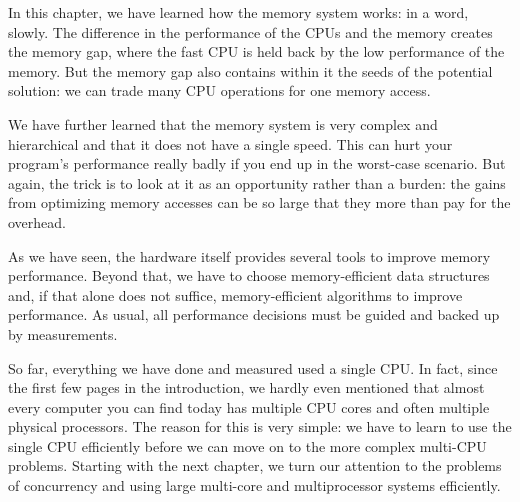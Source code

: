 In this chapter, we have learned how the memory system works: in a word, slowly. The difference in the performance of the CPUs and the memory creates the memory gap, where the fast CPU is held back by the low performance of the memory. But the memory gap also contains within it the seeds of the potential solution: we can trade many CPU operations for one memory access.

We have further learned that the memory system is very complex and hierarchical and that it does not have a single speed. This can hurt your program's performance really badly if you end up in the worst-case scenario. But again, the trick is to look at it as an opportunity rather than a burden: the gains from optimizing memory accesses can be so large that they more than pay for the overhead. 

As we have seen, the hardware itself provides several tools to improve memory performance. Beyond that, we have to choose memory-efficient data structures and, if that alone does not suffice, memory-efficient algorithms to improve performance. As usual, all performance decisions must be guided and backed up by measurements.

So far, everything we have done and measured used a single CPU. In fact, since the first few pages in the introduction, we hardly even mentioned that almost every computer you can find today has multiple CPU cores and often multiple physical processors. The reason for this is very simple: we have to learn to use the single CPU efficiently before we can move on to the more complex multi-CPU problems. Starting with the next chapter, we turn our attention to the problems of concurrency and using large multi-core and multiprocessor systems efficiently.